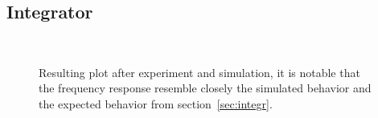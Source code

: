\documentclass[a4paper, twocolumn]{article}
\begin{document}
\subsection{Integrator}
\begin{figure}[ht!]
    \centering
     \\
    \caption{Resulting plot after experiment and simulation, it is notable that the frequency response resemble closely the simulated behavior and the expected behavior from section~\ref{sec:integr}.}
    \label{fig:expIntegr}
\end{figure}
\end{document}
